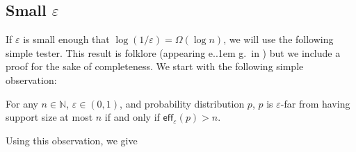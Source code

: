 \documentclass{theoretics}
\newcommand*\eg{e.\kern.1em g.\ }
\newcommand{\bN}{\ensuremath{\mathbb{N}}}
\newcommand{\eff}{\mathsf{eff}}
\renewcommand{\epsilon}{\varepsilon}
\begin{document}
\subsection{Small \texorpdfstring{$\epsilon$}{epsilon}}
\label{section:small-epsilon}

If $\epsilon$ is small enough that $\log(1/\epsilon) = \Omega(\log n)$, we will use the following
simple tester. This result is folklore (appearing \eg in \cite{GR23,AF24,AFL24}) but we include a
proof for the sake of completeness. We start with the following simple observation:
\begin{observation}
    \label{obs:eff}
    For any $n \in \bN$, $\epsilon \in (0,1)$, and probability distribution $p$, $p$ is
    $\epsilon$-far from having support size at most $n$ if and only if $\eff_\epsilon(p) > n$.
\end{observation}

\noindent
Using this observation, we give
\end{document}
